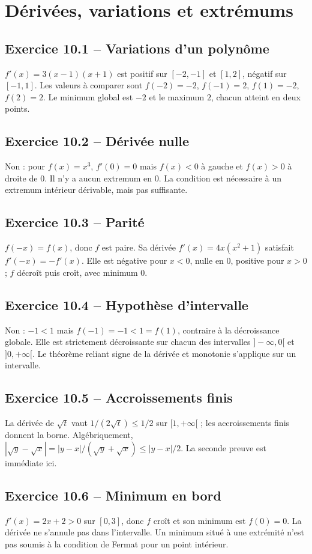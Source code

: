 \chapter{Dérivées, variations et extrémums}
\section*{Exercice 10.1 -- Variations d'un polynôme}
$f'(x)=3(x-1)(x+1)$ est positif sur $[-2,-1]$ et $[1,2]$, négatif sur $[-1,1]$. Les valeurs à comparer sont $f(-2)=-2$, $f(-1)=2$, $f(1)=-2$, $f(2)=2$. Le minimum global est $-2$ et le maximum $2$, chacun atteint en deux points.

\section*{Exercice 10.2 -- Dérivée nulle}
Non : pour $f(x)=x^3$, $f'(0)=0$ mais $f(x)<0$ à gauche et $f(x)>0$ à droite de $0$. Il n'y a aucun extremum en $0$. La condition est nécessaire à un extremum intérieur dérivable, mais pas suffisante.

\section*{Exercice 10.3 -- Parité}
$f(-x)=f(x)$, donc $f$ est paire. Sa dérivée $f'(x)=4x(x^2+1)$ satisfait $f'(-x)=-f'(x)$. Elle est négative pour $x<0$, nulle en $0$, positive pour $x>0$ ; $f$ décroît puis croît, avec minimum $0$.

\section*{Exercice 10.4 -- Hypothèse d'intervalle}
Non : $-1<1$ mais $f(-1)=-1<1=f(1)$, contraire à la décroissance globale. Elle est strictement décroissante sur chacun des intervalles $]-\infty,0[$ et $]0,+\infty[$. Le théorème reliant signe de la dérivée et monotonie s'applique sur un intervalle.

\section*{Exercice 10.5 -- Accroissements finis}
La dérivée de $\sqrt t$ vaut $1/(2\sqrt t)\le1/2$ sur $[1,+\infty[$ ; les accroissements finis donnent la borne. Algébriquement, $|\sqrt y-\sqrt x|=|y-x|/(\sqrt y+\sqrt x)\le|y-x|/2$. La seconde preuve est immédiate ici.

\section*{Exercice 10.6 -- Minimum en bord}
$f'(x)=2x+2>0$ sur $[0,3]$, donc $f$ croît et son minimum est $f(0)=0$. La dérivée ne s'annule pas dans l'intervalle. Un minimum situé à une extrémité n'est pas soumis à la condition de Fermat pour un point intérieur.
